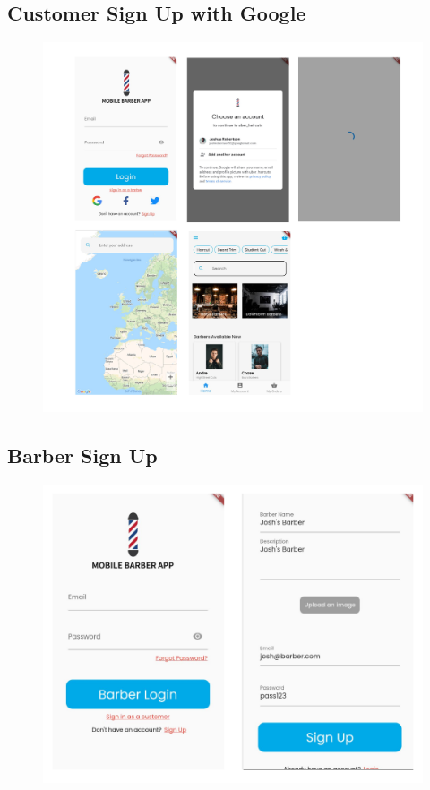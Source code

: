 \documentclass[12pt]{article}
\begin{document}
	\subsection{Customer Sign Up with Google}
	\label{app-image: sign-up-google}
	\begin{figure}[H]
		\centering
		\includegraphics[scale=0.22]{images/google-signup.png}
	\end{figure}

	\subsection{Barber Sign Up}
	\label{app-image: barber-sign-up}
	\begin{figure}[H]
		\centering
		\includegraphics[scale=0.4]{images/barber-sign-up.png}
	\end{figure}
\end{document}
